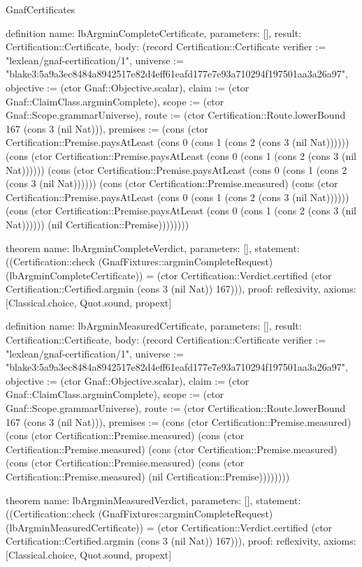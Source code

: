 \begin{lexlean}{GnafCertificates}
\begin{semanticmodule}
definition{
  name: lbArgminCompleteCertificate,
  parameters: [],
  result: Certification::Certificate,
  body: (record Certification::Certificate {verifier := "lexlean/gnaf-certification/1", universe := "blake3:5a9a3ec8484a8942517e82d4eff61eafd177e7e93a710294f197501aa3a26a97", objective := (ctor Gnaf::Objective.scalar), claim := (ctor Gnaf::ClaimClass.argminComplete), scope := (ctor Gnaf::Scope.grammarUniverse), route := (ctor Certification::Route.lowerBound 167 (cons 3 (nil Nat))), premises := (cons (ctor Certification::Premise.paysAtLeast (cons 0 (cons 1 (cons 2 (cons 3 (nil Nat)))))) (cons (ctor Certification::Premise.paysAtLeast (cons 0 (cons 1 (cons 2 (cons 3 (nil Nat)))))) (cons (ctor Certification::Premise.paysAtLeast (cons 0 (cons 1 (cons 2 (cons 3 (nil Nat)))))) (cons (ctor Certification::Premise.measured) (cons (ctor Certification::Premise.paysAtLeast (cons 0 (cons 1 (cons 2 (cons 3 (nil Nat)))))) (cons (ctor Certification::Premise.paysAtLeast (cons 0 (cons 1 (cons 2 (cons 3 (nil Nat)))))) (nil Certification::Premise)))))))})
}

theorem{
  name: lbArgminCompleteVerdict,
  parameters: [],
  statement: ((Certification::check (GnafFixtures::argminCompleteRequest) (lbArgminCompleteCertificate)) = (ctor Certification::Verdict.certified (ctor Certification::Certified.argmin (cons 3 (nil Nat)) 167))),
  proof: reflexivity{},
  axioms: [Classical.choice, Quot.sound, propext]
}

definition{
  name: lbArgminMeasuredCertificate,
  parameters: [],
  result: Certification::Certificate,
  body: (record Certification::Certificate {verifier := "lexlean/gnaf-certification/1", universe := "blake3:5a9a3ec8484a8942517e82d4eff61eafd177e7e93a710294f197501aa3a26a97", objective := (ctor Gnaf::Objective.scalar), claim := (ctor Gnaf::ClaimClass.argminComplete), scope := (ctor Gnaf::Scope.grammarUniverse), route := (ctor Certification::Route.lowerBound 167 (cons 3 (nil Nat))), premises := (cons (ctor Certification::Premise.measured) (cons (ctor Certification::Premise.measured) (cons (ctor Certification::Premise.measured) (cons (ctor Certification::Premise.measured) (cons (ctor Certification::Premise.measured) (cons (ctor Certification::Premise.measured) (nil Certification::Premise)))))))})
}

theorem{
  name: lbArgminMeasuredVerdict,
  parameters: [],
  statement: ((Certification::check (GnafFixtures::argminCompleteRequest) (lbArgminMeasuredCertificate)) = (ctor Certification::Verdict.certified (ctor Certification::Certified.argmin (cons 3 (nil Nat)) 167))),
  proof: reflexivity{},
  axioms: [Classical.choice, Quot.sound, propext]
}


\end{semanticmodule}
\end{lexlean}
